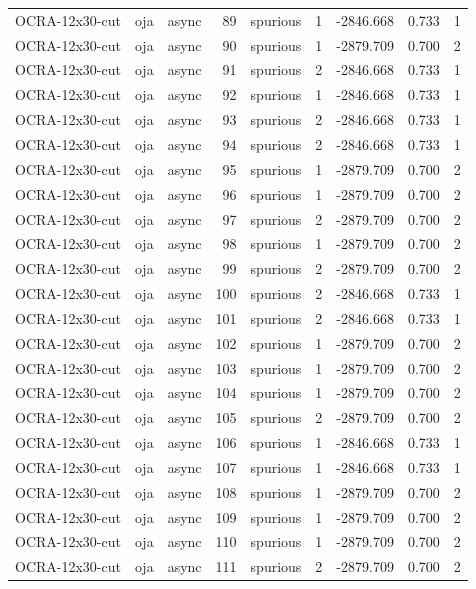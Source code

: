 \begin{tabular}{lllrlrrrr}
OCRA-12x30-cut & oja & async & 89 & spurious & 1 & -2846.668 & 0.733 & 1 \\
OCRA-12x30-cut & oja & async & 90 & spurious & 1 & -2879.709 & 0.700 & 2 \\
OCRA-12x30-cut & oja & async & 91 & spurious & 2 & -2846.668 & 0.733 & 1 \\
OCRA-12x30-cut & oja & async & 92 & spurious & 1 & -2846.668 & 0.733 & 1 \\
OCRA-12x30-cut & oja & async & 93 & spurious & 2 & -2846.668 & 0.733 & 1 \\
OCRA-12x30-cut & oja & async & 94 & spurious & 2 & -2846.668 & 0.733 & 1 \\
OCRA-12x30-cut & oja & async & 95 & spurious & 1 & -2879.709 & 0.700 & 2 \\
OCRA-12x30-cut & oja & async & 96 & spurious & 1 & -2879.709 & 0.700 & 2 \\
OCRA-12x30-cut & oja & async & 97 & spurious & 2 & -2879.709 & 0.700 & 2 \\
OCRA-12x30-cut & oja & async & 98 & spurious & 1 & -2879.709 & 0.700 & 2 \\
OCRA-12x30-cut & oja & async & 99 & spurious & 2 & -2879.709 & 0.700 & 2 \\
OCRA-12x30-cut & oja & async & 100 & spurious & 2 & -2846.668 & 0.733 & 1 \\
OCRA-12x30-cut & oja & async & 101 & spurious & 2 & -2846.668 & 0.733 & 1 \\
OCRA-12x30-cut & oja & async & 102 & spurious & 1 & -2879.709 & 0.700 & 2 \\
OCRA-12x30-cut & oja & async & 103 & spurious & 1 & -2879.709 & 0.700 & 2 \\
OCRA-12x30-cut & oja & async & 104 & spurious & 1 & -2879.709 & 0.700 & 2 \\
OCRA-12x30-cut & oja & async & 105 & spurious & 2 & -2879.709 & 0.700 & 2 \\
OCRA-12x30-cut & oja & async & 106 & spurious & 1 & -2846.668 & 0.733 & 1 \\
OCRA-12x30-cut & oja & async & 107 & spurious & 1 & -2846.668 & 0.733 & 1 \\
OCRA-12x30-cut & oja & async & 108 & spurious & 1 & -2879.709 & 0.700 & 2 \\
OCRA-12x30-cut & oja & async & 109 & spurious & 1 & -2879.709 & 0.700 & 2 \\
OCRA-12x30-cut & oja & async & 110 & spurious & 1 & -2879.709 & 0.700 & 2 \\
OCRA-12x30-cut & oja & async & 111 & spurious & 2 & -2879.709 & 0.700 & 2 \\

\end{tabular}
